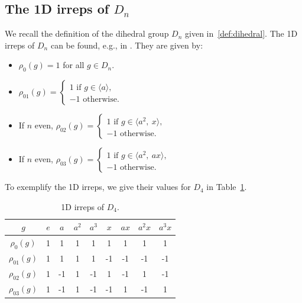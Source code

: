 \documentclass{article}
\theoremstyle{plain}
\theoremstyle{definition}
\theoremstyle{remark}
\begin{document}
\subsection{The 1D irreps of $D_n$}\label{app:1dirreps}
We recall the definition of the dihedral group $D_n$ given in~\eqref{def:dihedral}. The 1D irreps of $D_n$ can be found, e.g., in \citep{steinberg2011representation}. They are given by:
\begin{itemize}
    \item $\rho_{0}(g)=1$ for all $g\in D_n$.
    \item $\rho_{01}(g)=\begin{cases}
        1 \text{ if } g\in \langle a\rangle,\\
        -1 \text{ otherwise.}
    \end{cases}$
    \item If $n$ even, $\rho_{02}(g)=\begin{cases}
        1 \text{ if } g\in \langle a^2,\ x\rangle,\\
        -1 \text{ otherwise.}
    \end{cases}$
    \item If $n$ even, $\rho_{03}(g)=\begin{cases}
        1 \text{ if } g\in \langle a^2,\ ax\rangle,\\
        -1 \text{ otherwise.}
    \end{cases}$
\end{itemize}
To exemplify the 1D irreps, we give their values for $D_4$ in Table~\ref{tab:1dirreps}.
\begin{table}[H]
    \centering
    \begin{tabular}{|c||c|c|c|c|c|c|c|c|}
        \hline
         $g$&$e$&$a$&$a^2$&$a^3$&$x$&$ax$&$a^2x$&$a^3x$ \\
         \hline
         \hline
         $\rho_{0}(g)$&1&1&1&1&1&1&1&1 \\
         \hline
         $\rho_{01}(g)$&1&1&1&1&-1&-1&-1&-1 \\
         \hline
         $\rho_{02}(g)$&1&-1&1&-1&1&-1&1&-1 \\
         \hline
         $\rho_{03}(g)$&1&-1&1&-1&-1&1&-1&1 \\
         \hline
    \end{tabular}
    \caption{1D irreps of $D_4$.}
    \label{tab:1dirreps}
\end{table}
\end{document}
